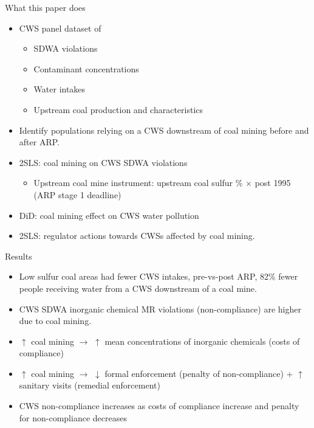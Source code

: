 \documentclass{beamer}
\begin{document}
\begin{frame}{What this paper does}
\begin{itemize}
    \item CWS panel dataset of
    \begin{itemize}
        \item SDWA violations
        \item Contaminant concentrations
        \item Water intakes
        \item Upstream coal production and characteristics
    \end{itemize}
    \item Identify populations relying on a CWS downstream of coal mining before and after ARP.

    \item 2SLS: coal mining on CWS SDWA violations
        \begin{itemize}
            \item Upstream coal mine instrument: upstream coal sulfur \% $\times$ post 1995 (ARP stage 1 deadline)
        \end{itemize}
        
    \item DiD: coal mining effect on CWS water pollution

    \item 2SLS: regulator actions towards CWSs affected by coal mining.

\end{itemize}    
\end{frame}

\begin{frame}{Results}
\begin{itemize}
\item Low sulfur coal areas had fewer CWS intakes, pre-vs-post ARP, 82\% fewer people receiving water from a CWS downstream of a coal mine.

\item CWS SDWA inorganic chemical MR violations (non-compliance) are higher due to coal mining.

\item $\uparrow$ coal mining $\rightarrow$ $\uparrow$ mean concentrations of inorganic chemicals (costs of compliance)
  
\item $\uparrow$ coal mining $\rightarrow$ $\downarrow$ formal enforcement (penalty of non-compliance) + $\uparrow$ sanitary visits (remedial enforcement)

\item CWS non-compliance increases as costs of compliance increase and penalty for non-compliance decreases
\end{itemize}
\end{frame}
\end{document}

